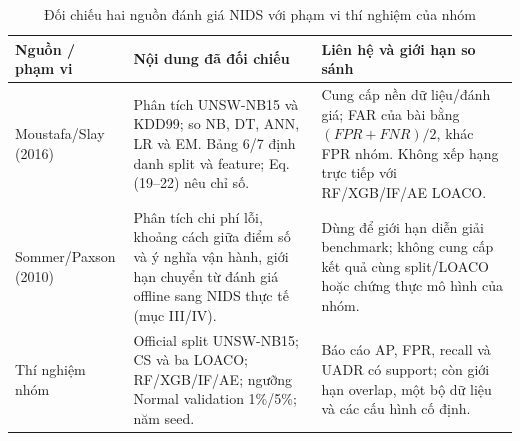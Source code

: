 \begin{table}[H]\centering\small\renewcommand{\arraystretch}{1.2}
\caption{Đối chiếu hai nguồn đánh giá NIDS với phạm vi thí nghiệm của nhóm}
\begin{tabularx}{\textwidth}{L{3.0cm}Y Y}\toprule
Nguồn / phạm vi & Nội dung đã đối chiếu & Liên hệ và giới hạn so sánh\\\midrule
Moustafa/Slay (2016) \cite{moustafa2016} & Phân tích UNSW-NB15 và KDD99; so NB, DT, ANN, LR và EM. Bảng 6/7 định danh split và feature; Eq.(19--22) nêu chỉ số. & Cung cấp nền dữ liệu/đánh giá; FAR của bài bằng $(FPR+FNR)/2$, khác FPR nhóm. Không xếp hạng trực tiếp với RF/XGB/IF/AE LOACO.\\
Sommer/Paxson (2010) \cite{sommer2010} & Phân tích chi phí lỗi, khoảng cách giữa điểm số và ý nghĩa vận hành, giới hạn chuyển từ đánh giá offline sang NIDS thực tế (mục III/IV). & Dùng để giới hạn diễn giải benchmark; không cung cấp kết quả cùng split/LOACO hoặc chứng thực mô hình của nhóm.\\
Thí nghiệm nhóm & Official split UNSW-NB15; CS và ba LOACO; RF/XGB/IF/AE; ngưỡng Normal validation 1\%/5\%; năm seed. & Báo cáo AP, FPR, recall và UADR có support; còn giới hạn overlap, một bộ dữ liệu và các cấu hình cố định.\\
\bottomrule\end{tabularx}\end{table}
